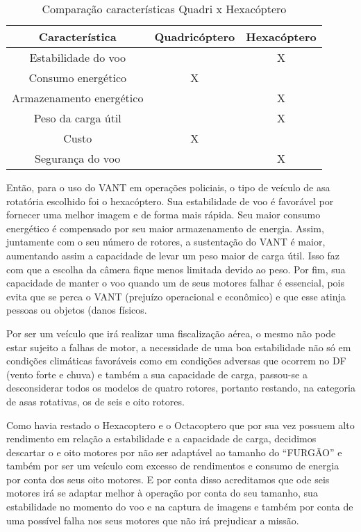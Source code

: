 \begin{table}
\begin{center}
\begin{tabular}{|c|c|c|} \hline
	Característica & Quadricóptero & Hexacóptero \\ \hline\hline
	Estabilidade do voo & & X \\ \hline
	Consumo energético & X & \\ \hline
	Armazenamento energético & & X \\ \hline
	Peso da carga útil & & X \\ \hline
	Custo & X & \\ \hline
	Segurança do voo & & X \\ \hline
\end{tabular}
\end{center}
\caption{Comparação características Quadri x Hexacóptero}
\end{table}

Então, para o uso do VANT em operações policiais, o tipo de veículo de asa rotatória escolhido foi o hexacóptero. Sua estabilidade de voo é favorável por fornecer uma melhor imagem e de forma mais rápida. Seu maior consumo energético é compensado por seu maior armazenamento de energia. Assim, juntamente com o seu número de rotores, a sustentação do VANT é maior, aumentando assim a capacidade de levar um peso maior de carga útil. Isso faz com que a escolha da câmera fique menos limitada devido ao peso. Por fim, sua capacidade de manter o voo quando um de seus motores falhar é essencial, pois evita que se perca o VANT (prejuízo operacional e econômico) e que esse atinja pessoas ou objetos (danos físicos.

Por ser um veículo que irá realizar uma fiscalização aérea, o mesmo não pode estar sujeito a falhas de motor, a necessidade de uma boa estabilidade não só em condições climáticas favoráveis como em condições adversas que ocorrem no DF (vento forte e chuva) e também a sua capacidade de carga, passou-se a desconsiderar todos os modelos de quatro rotores, portanto restando, na categoria de asas rotativas, os de seis e oito rotores.

Como havia restado o Hexacoptero e o Octacoptero que por sua vez possuem alto rendimento em relação a estabilidade e a capacidade de carga, decidimos descartar o e oito motores por não ser adaptável ao tamanho do “FURGÃO” e também por ser um veículo com excesso de rendimentos e consumo de energia por conta dos seus oito motores. E por conta disso acreditamos que ode seis motores irá se adaptar melhor à operação por conta do seu tamanho, sua estabilidade no momento do voo e na captura de imagens e também por conta de uma possível falha nos seus motores que não irá prejudicar a missão.

